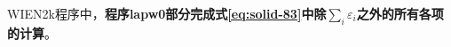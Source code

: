 \textrm{WIEN2k}程序中，\textbf{程序\textrm{lapw0}部分完成式\eqref{eq:solid-83}中除$\sum\limits_i\varepsilon_i$之外的所有各项的计算}。
%
